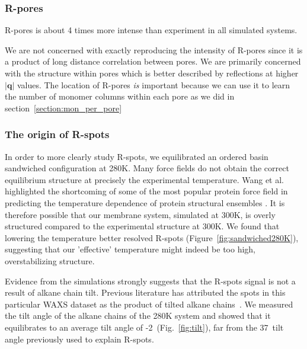 \documentclass[journal=jpcbfk,manuscript=article]{achemso}
\begin{document}
  \subsubsection{R-pores}\label{section:rpores}
  
   R-pores is about 4 times more intense than experiment in all simulated systems. 
    
   We are not concerned with exactly reproducing the intensity of R-pores since it is a 
   product of long distance correlation between pores. We are primarily concerned with
   the structure within pores which is better described by reflections at higher 
   $|\mathbf{q}|$ values. The location of R-pores \textit{is} important because we can 
   use it to learn the number of monomer columns within each pore as we did in 
   section~\ref{section:mon_per_pore}

  \subsubsection{The origin of R-spots}\label{section:rspots}
  In order to more clearly study R-spots, we equilibrated an ordered basin sandwiched 
  configuration at 280K. Many force fields do not obtain the correct equilibrium structure
  at precisely the experimental temperature. Wang et al. highlighted the shortcoming of 
  some of the most popular protein force field in predicting the temperature dependence 
  of protein structural ensembles \cite{wang_building_2017}. It is therefore possible that   %
  our membrane system, simulated at 300K, is overly structured compared to the experimental
  structure at 300K. We found that lowering the temperature better resolved R-spots 
  (Figure~\ref{fig:sandwiched280K}), suggesting that our 'effective' temperature might 
  indeed be too high, overstabilizing structure. 
  
 
  Evidence from the simulations strongly suggests that the R-spots signal is not a 
  result of alkane chain tilt. Previous literature has attributed the spots in 
  this particular WAXS dataset as the product of tilted alkane chains~\cite{feng_scalable_2014}.
  We measured the tilt angle of the alkane chains of the 280K system and showed
  that it equilibrates to an average tilt angle of -2\degree~(Fig.~\ref{fig:tilt}),
  far from the 37\degree~tilt angle previously used to explain R-spots. 
\end{document}
